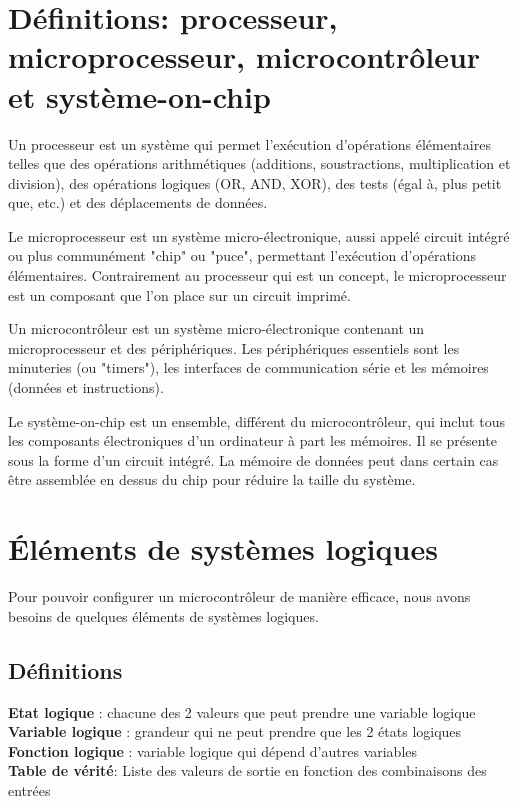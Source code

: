 \section{Définitions: processeur, microprocesseur, microcontrôleur et système-on-chip}

Un processeur est un système qui permet l'exécution d'opérations élémentaires telles que des opérations arithmétiques (additions, soustractions, multiplication et division), des opérations logiques (OR, AND, XOR), des tests (égal à, plus petit que, etc.) et des déplacements de données.

Le microprocesseur est un système micro-électronique, aussi appelé circuit intégré ou plus communément "chip" ou "puce", permettant l'exécution d'opérations élémentaires. Contrairement au processeur qui est un concept, le microprocesseur est un composant que l'on place sur un circuit imprimé.

Un microcontrôleur est un système micro-électronique contenant un microprocesseur et des périphériques. Les périphériques essentiels sont les minuteries (ou "timers"), les interfaces de communication série et les mémoires (données et instructions).

Le système-on-chip est un ensemble, différent du microcontrôleur, qui inclut tous les composants électroniques d'un ordinateur à part les mémoires. Il se présente sous la forme d'un circuit intégré. La mémoire de données peut dans certain cas être assemblée en dessus du chip pour réduire la taille du système.


\section{Éléments de systèmes logiques}

Pour pouvoir configurer un microcontrôleur de manière efficace, nous avons besoins de quelques éléments de systèmes logiques.

\subsection{Définitions}

\textbf{Etat logique} : chacune des 2 valeurs que peut prendre une variable logique\\
\textbf{Variable logique} : grandeur qui ne peut prendre que les 2 états logiques\\
\textbf{Fonction logique} : variable logique qui dépend d'autres variables\\
\textbf{Table de vérité}: Liste des valeurs de sortie en fonction des combinaisons des entrées

